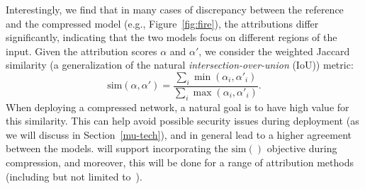 Interestingly, we find that in many cases of discrepancy between the reference and the compressed model (e.g., Figure~\ref{fig:fire}), the attributions differ significantly, indicating that the two models focus on different regions of the input.  Given the attribution scores $\alpha$ and $\alpha'$, we consider the weighted Jaccard similarity (a generalization of the natural {\em intersection-over-union} (IoU)) metric:%
\[ \text{sim}(\alpha, \alpha') = \frac{ \sum_i \min( \alpha_i, \alpha'_i )}{\sum_i \max (\alpha_i, \alpha'_i) }. \]
When deploying a compressed network, a natural goal is to have high value for this similarity.  This can help avoid possible security issues during deployment (as we will discuss in Section~\ref{mu-tech}),
 and in general lead to a higher agreement between the models.
\label{fse-metric}
\ardent{} will support incorporating the $\text{sim}()$ objective during compression, and moreover, this will be done for a range of attribution methods (including but not limited to~\cite{SimonyanVZ13,Mukund2017Axiomatic,ancona2018towards}).